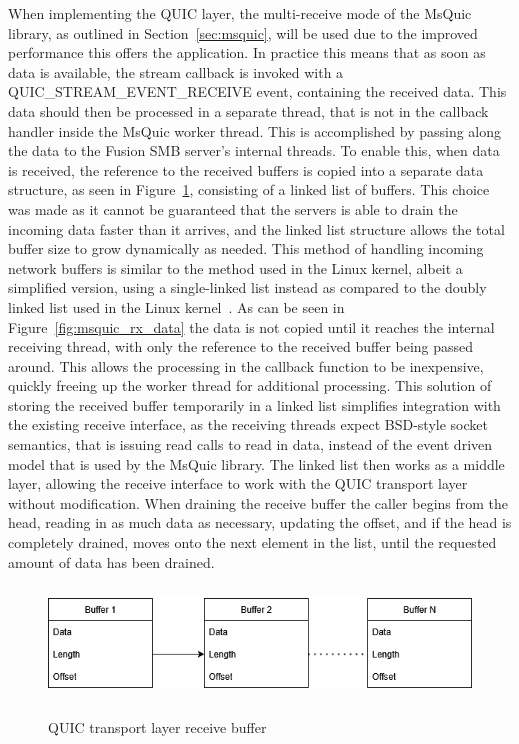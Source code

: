 \documentclass[english, 12pt, a4paper, elec, utf8, a-2b, online]{aaltothesis}
\begin{document}
When implementing the QUIC layer, the multi-receive mode of the MsQuic
library, as outlined in Section~\ref{sec:msquic}, will be used due to the improved performance
this offers the application. In practice this means that as soon as data is available,
the stream callback is invoked with a QUIC\_STREAM\_EVENT\_RECEIVE event, containing
the received data. This data should then be processed in a separate thread, that is not in
the callback handler inside the MsQuic worker thread. This is accomplished by passing
along the data to the Fusion SMB server's internal threads. To enable this,
when data is received, the reference to the received buffers is copied into a separate
data structure, as seen in Figure~\ref{fig:msquic_buf}, consisting of a linked list
of buffers. This choice was made as it cannot be guaranteed that the servers is able to drain 
the incoming data faster than it arrives, and the linked list structure allows
the total buffer size to grow dynamically as needed. This method of handling incoming
network buffers is similar to the method used in the Linux kernel, albeit a simplified
version, using a single-linked list instead as compared to the doubly linked list
used in the Linux kernel~\cite{linux_network_buffer}.
As can be seen in Figure~\ref{fig:msquic_rx_data} the data is not copied until
it reaches the internal receiving thread, with only the reference to the received buffer being
passed around. This allows the processing in the callback function to be inexpensive,
quickly freeing up the worker thread for additional processing.
This solution of storing the received buffer temporarily in a linked list simplifies
integration with the existing receive interface, as the receiving threads
expect BSD-style socket semantics, that is issuing read calls to read in data, instead of the
event driven model that is used by the MsQuic library. The linked list then works as a middle
layer, allowing the receive interface to work with the QUIC transport layer without modification.
When draining the receive buffer the caller begins from the head, reading in as
much data as necessary, updating the offset, and if the head is completely drained,
moves onto the next element in the list, until the requested amount of data has
been drained.

\begin{figure}[h]
	\centering
	\includegraphics[alt={Block diagram of the receive buffer of the QUIC layer}, height=3cm]{./images/quic_buffer.png}
	\caption{QUIC transport layer receive buffer}
	\label{fig:msquic_buf}
\end{figure}
\end{document}
